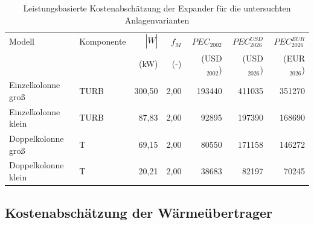 \begin{table}[H]
\centering
\caption{Leistungsbasierte Kostenabschätzung der Expander für die untersuchten Anlagenvarianten}
\label{tab:kosten_expander}
\begin{tabular}{llrrrrr}
\hline
Modell & Komponente & $|\dot W|$ & $f_M$ & $PEC_{2002}$ & $PEC_{2026}^{USD}$ & $PEC_{2026}^{EUR}$ \\
 & & (kW) & (-) & (USD$_{2002}$) & (USD$_{2026}$) & (EUR$_{2026}$) \\
\hline
Einzelkolonne groß & TURB & 300{,}50 & 2{,}00 & 193440 & 411035 & 351270 \\
Einzelkolonne klein & TURB & 87{,}83 & 2{,}00 & 92895 & 197390 & 168690 \\
Doppelkolonne groß & T & 69{,}15 & 2{,}00 & 80550 & 171158 & 146272 \\
Doppelkolonne klein & T & 20{,}21 & 2{,}00 & 38683 & 82197 & 70245 \\
\hline
\end{tabular}
\end{table}

\subsection*{Kostenabschätzung der Wärmeübertrager}

